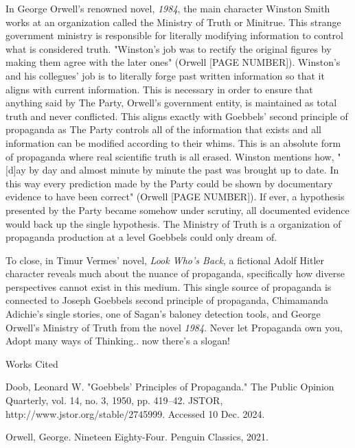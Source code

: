 \documentclass[12pt]{article}
\begin{document}
In George Orwell's renowned novel, \textit{1984}, the main character Winston Smith
works at an organization called the Ministry of Truth or Minitrue. This strange government ministry is responsible for
literally modifying information to control what is considered truth. "Winston's job was to rectify the original
figures by making them agree with the later ones" (Orwell [PAGE NUMBER]). Winston's and his collegues' job is to
literally forge past written information so that it aligns with current information. This is necessary in order to
ensure that anything said by The Party, Orwell's government entity, is maintained as total truth and never conflicted.
This aligns exactly with Goebbels' second principle of propaganda as The Party controls all of the information that exists
and all information can be modified according to their whims. This is an absolute form of propaganda where real scientific
truth is all erased. Winston mentions how, "[d]ay by day and almost minute by minute the past was
brought up to date. In this way every prediction made by the Party could be shown by documentary evidence to have been correct"
(Orwell [PAGE NUMBER]). If ever, a hypothesis presented by the Party became somehow under scrutiny, all documented evidence
would back up the single hypothesis. The Ministry of Truth is a organization of propaganda production at a level Goebbels
could only dream of.

To close, in Timur Vermes' novel, \textit{Look Who's Back}, a fictional Adolf Hitler character reveals much about the nuance
of propaganda, specifically how diverse perspectives cannot exist in this medium. This single source of propaganda is
connected to Joseph Goebbels second principle of propaganda, Chimamanda Adichie's single stories,
one of Sagan's baloney detection tools, and George Orwell's Ministry of Truth from the novel \textit{1984}.
Never let Propaganda own you, Adopt many ways of Thinking.. now there's a slogan!

\newpage

\begin{center}
Works Cited
\end{center}

\begin{hangparas}{0.5in}{1}


Doob, Leonard W. "Goebbels’ Principles of Propaganda." The Public Opinion Quarterly,
vol. 14, no. 3, 1950, pp. 419–42. JSTOR, http://www.jstor.org/stable/2745999. Accessed 10 Dec. 2024.

Orwell, George. Nineteen Eighty-Four. Penguin Classics, 2021.

\end{hangparas}
\end{document}
